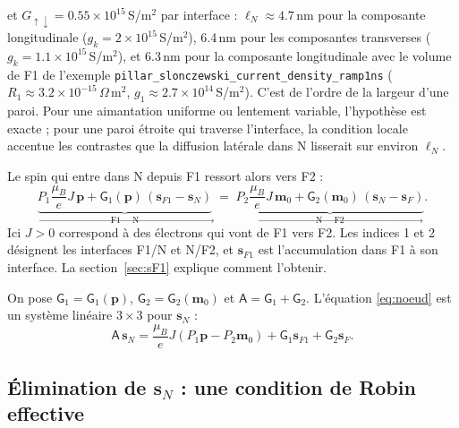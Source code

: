 \documentclass[11pt,a4paper]{article}
\newcommand{\vm}{\bm{m}}
\newcommand{\vp}{\bm{p}}
\newcommand{\vs}{\bm{s}}
\newcommand{\mG}{\mathsf{G}}
\newcommand{\mA}{\mathsf{A}}
\begin{document}
\begin{enumerate}
    et $G_{\uparrow\downarrow} = 0.55\times10^{15}$\,S/m$^2$ par interface :
    $\ell_N\approx4.7$\,nm pour la composante longitudinale
    ($g_k = 2\times10^{15}$\,S/m$^2$), 6.4\,nm pour les composantes
    transverses ($g_k = 1.1\times10^{15}$\,S/m$^2$), et 6.3\,nm pour la
    composante longitudinale avec le volume de F1 de l'exemple
    \texttt{pillar\_slonczewski\_current\_density\_ramp1ns}
    ($R_1\approx3.2\times10^{-15}\,\Omega\,$m$^2$,
    $g_1\approx2.7\times10^{14}$\,S/m$^2$). C'est de l'ordre de la largeur
    d'une paroi. Pour une aimantation uniforme ou lentement variable,
    l'hypothèse est exacte ; pour une paroi étroite qui traverse
    l'interface, la condition locale accentue les contrastes que la
    diffusion latérale dans N lisserait sur environ $\ell_N$.
\end{enumerate}
Le spin qui entre dans N depuis F1 ressort alors vers F2 :
\begin{equation}
  \underbrace{P_1\frac{\mu_B}{e}J\,\vp + \mG_1(\vp)\,(\vs_{F1}-\vs_N)}_{\text{F1}\,\to\,\text{N}}
  \;=\;
  \underbrace{P_2\frac{\mu_B}{e}J\,\vm_0 + \mG_2(\vm_0)\,(\vs_N-\vs_F)}_{\text{N}\,\to\,\text{F2}}.
  \label{eq:noeud}
\end{equation}
Ici $J>0$ correspond à des électrons qui vont de F1 vers F2. Les indices 1
et 2 désignent les interfaces F1/N et N/F2, et $\vs_{F1}$ est
l'accumulation dans F1 à son interface. La section~\ref{sec:sF1} explique
comment l'obtenir.

On pose $\mG_1 = \mG_1(\vp)$, $\mG_2 = \mG_2(\vm_0)$ et
$\mA = \mG_1 + \mG_2$. L'équation \eqref{eq:noeud} est un système linéaire
$3\times3$ pour $\vs_N$ :
\begin{equation}
  \mA\,\vs_N = \frac{\mu_B}{e}J\left(P_1\vp - P_2\vm_0\right)
  + \mG_1\vs_{F1} + \mG_2\vs_F.
\end{equation}

\subsection{Élimination de \texorpdfstring{$\vs_N$}{sN} : une condition de Robin effective}
\end{document}
